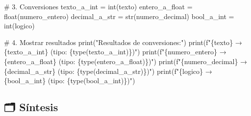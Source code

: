 \documentclass[
  doc,
  floatsintext,
  longtable,
  a4paper,
  nolmodern,
  notxfonts,
  notimes,
  12pt,
  colorlinks=true,linkcolor=blue,citecolor=blue,urlcolor=blue]{apa7}
\newenvironment{Shaded}{\begin{snugshade}}{\end{snugshade}}
\newcommand{\BuiltInTok}[1]{\textcolor[rgb]{0.00,0.23,0.31}{#1}}
\newcommand{\CommentTok}[1]{\textcolor[rgb]{0.37,0.37,0.37}{#1}}
\newcommand{\NormalTok}[1]{\textcolor[rgb]{0.00,0.23,0.31}{#1}}
\newcommand{\OperatorTok}[1]{\textcolor[rgb]{0.37,0.37,0.37}{#1}}
\newcommand{\SpecialCharTok}[1]{\textcolor[rgb]{0.37,0.37,0.37}{#1}}
\newcommand{\SpecialStringTok}[1]{\textcolor[rgb]{0.13,0.47,0.30}{#1}}
\newcommand{\StringTok}[1]{\textcolor[rgb]{0.13,0.47,0.30}{#1}}
\begin{document}
\begin{Shaded}
\begin{Highlighting}[]
\CommentTok{\# 3. Conversiones}
\NormalTok{texto\_a\_int }\OperatorTok{=} \BuiltInTok{int}\NormalTok{(texto)}
\NormalTok{entero\_a\_float }\OperatorTok{=} \BuiltInTok{float}\NormalTok{(numero\_entero)}
\NormalTok{decimal\_a\_str }\OperatorTok{=} \BuiltInTok{str}\NormalTok{(numero\_decimal)}
\NormalTok{bool\_a\_int }\OperatorTok{=} \BuiltInTok{int}\NormalTok{(logico)}

\CommentTok{\# 4. Mostrar resultados}
\BuiltInTok{print}\NormalTok{(}\StringTok{"Resultados de conversiones:"}\NormalTok{)}
\BuiltInTok{print}\NormalTok{(}\SpecialStringTok{f"\textquotesingle{}}\SpecialCharTok{\{}\NormalTok{texto}\SpecialCharTok{\}}\SpecialStringTok{\textquotesingle{} → }\SpecialCharTok{\{}\NormalTok{texto\_a\_int}\SpecialCharTok{\}}\SpecialStringTok{ (tipo: }\SpecialCharTok{\{}\BuiltInTok{type}\NormalTok{(texto\_a\_int)}\SpecialCharTok{\}}\SpecialStringTok{)"}\NormalTok{)}
\BuiltInTok{print}\NormalTok{(}\SpecialStringTok{f"}\SpecialCharTok{\{}\NormalTok{numero\_entero}\SpecialCharTok{\}}\SpecialStringTok{ → }\SpecialCharTok{\{}\NormalTok{entero\_a\_float}\SpecialCharTok{\}}\SpecialStringTok{ (tipo: }\SpecialCharTok{\{}\BuiltInTok{type}\NormalTok{(entero\_a\_float)}\SpecialCharTok{\}}\SpecialStringTok{)"}\NormalTok{)}
\BuiltInTok{print}\NormalTok{(}\SpecialStringTok{f"}\SpecialCharTok{\{}\NormalTok{numero\_decimal}\SpecialCharTok{\}}\SpecialStringTok{ → \textquotesingle{}}\SpecialCharTok{\{}\NormalTok{decimal\_a\_str}\SpecialCharTok{\}}\SpecialStringTok{\textquotesingle{} (tipo: }\SpecialCharTok{\{}\BuiltInTok{type}\NormalTok{(decimal\_a\_str)}\SpecialCharTok{\}}\SpecialStringTok{)"}\NormalTok{)}
\BuiltInTok{print}\NormalTok{(}\SpecialStringTok{f"}\SpecialCharTok{\{}\NormalTok{logico}\SpecialCharTok{\}}\SpecialStringTok{ → }\SpecialCharTok{\{}\NormalTok{bool\_a\_int}\SpecialCharTok{\}}\SpecialStringTok{ (tipo: }\SpecialCharTok{\{}\BuiltInTok{type}\NormalTok{(bool\_a\_int)}\SpecialCharTok{\}}\SpecialStringTok{)"}\NormalTok{)}
\end{Highlighting}
\end{Shaded}

\subsection{🗂️ Síntesis}\label{suxedntesis}
\end{document}
